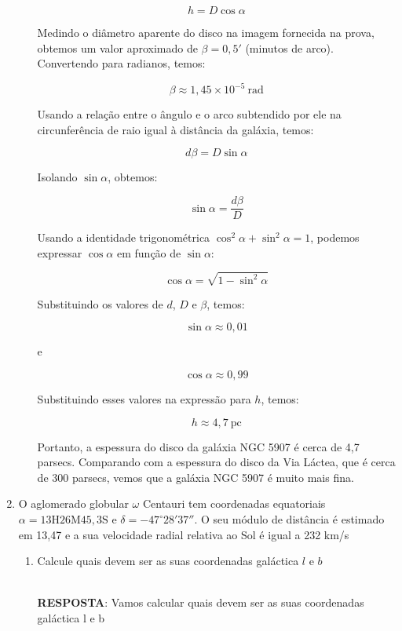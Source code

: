 \documentclass[a4paper,12pt]{article}
\begin{document}
\begin{enumerate}
\begin{enumerate}
$$
h = D \cos \alpha
$$

Medindo o diâmetro aparente do disco na imagem fornecida na prova, obtemos um valor aproximado de $\beta = 0,5'$ (minutos de arco). Convertendo para radianos, temos:

$$
\beta \approx 1,45 \times 10^{-5}~\text{rad}
$$

Usando a relação entre o ângulo e o arco subtendido por ele na circunferência de raio igual à distância da galáxia, temos:

$$
d \beta = D \sin \alpha
$$

Isolando $\sin \alpha$, obtemos:

$$
\sin \alpha = \frac{d \beta}{D}
$$

Usando a identidade trigonométrica $\cos^2 \alpha + \sin^2 \alpha = 1$, podemos expressar $\cos \alpha$ em função de $\sin \alpha$:

$$
\cos \alpha = \sqrt{1 - \sin^2 \alpha}
$$

Substituindo os valores de $d$, $D$ e $\beta$, temos:

$$
\sin \alpha \approx 0,01
$$

e

$$
\cos \alpha \approx 0,99
$$

Substituindo esses valores na expressão para $h$, temos:

$$
h \approx 4,7~\text{pc}
$$

Portanto, a espessura do disco da galáxia NGC 5907 é cerca de 4,7 parsecs. Comparando com a espessura do disco da Via Láctea, que é cerca de 300 parsecs, vemos que a galáxia NGC 5907 é muito mais fina.

\end{enumerate}

\noindent\hrulefill

\item  O aglomerado globular $\omega$ Centauri tem coordenadas equatoriais $\alpha=13\mathrm{H}26\mathrm{M}45,3\mathrm{S}$ e $\delta=-47^\circ28'37''$. O seu módulo de distância é estimado em 13,47 e a sua velocidade radial relativa ao Sol é igual a 232 km/s

\begin{enumerate}
\item Calcule quais devem ser as suas coordenadas galáctica $l$ e $b$

\noindent\hrulefill\\\textbf{RESPOSTA}: Vamos calcular quais devem ser as suas coordenadas galáctica l e b


\end{enumerate}
\end{enumerate}
\end{document}
